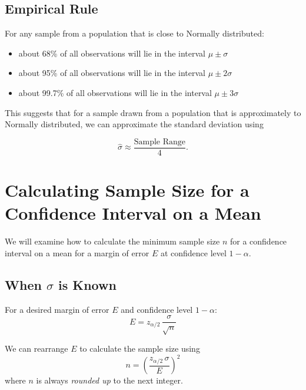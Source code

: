 

\subsection{Empirical Rule}

For any sample from a population that is close to Normally distributed:

\begin{itemize}
    \item about 68\% of all observations will lie in the interval \(\mu \pm \sigma\)
    \item about 95\% of all observations will lie in the interval \(\mu \pm 2\sigma\)
    \item about 99.7\% of all observations will lie in the interval \(\mu \pm 3\sigma\)
\end{itemize}

This suggests that for a sample drawn from a population that is approximately to Normally distributed, we can approximate the standard deviation using

\[
\hat{\sigma} \approx \frac{\text{Sample Range}}{4}.
\]




\section{Calculating Sample Size for a Confidence Interval on a Mean}
\label{secSampleSizeCIMean}

We will examine how to calculate the minimum sample size $n$ for a confidence interval on a mean for a margin of error $E$ at confidence level $1-\alpha$.
\subsection*{When \(\sigma\) is Known}
For a desired margin of error \(E\) and confidence level \(1-\alpha\):
\[
E = z_{\alpha/2}\,\frac{\sigma}{\sqrt{n}}
\]


We can rearrange $E$ to calculate the sample size using
\[
	n = \left( \frac{z_{\alpha/2}\,\sigma}{E} \right)^2
\]
where $n$ is always \emph{rounded up} to the next integer.\\

